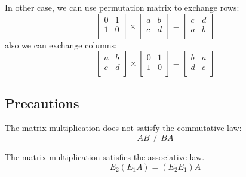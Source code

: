         In other case, we can use permutation matrix to exchange rows:
                \begin{equation}
                    \begin{bmatrix}
                        0 & 1  \\
                        1 & 0  \\
                    \end{bmatrix}
                    \times
                    \begin{bmatrix}
                        a & b  \\
                        c & d  \\
                    \end{bmatrix}
                    =
                    \begin{bmatrix}
                        c & d  \\
                        a & b  \\
                    \end{bmatrix}
                \end{equation}
        also we can exchange columns:
                \begin{equation}
                    \begin{bmatrix}
                        a & b  \\
                        c & d  \\
                    \end{bmatrix}
                    \times
                    \begin{bmatrix}
                        0 & 1  \\
                        1 & 0  \\
                    \end{bmatrix}
                    =
                    \begin{bmatrix}
                        b & a  \\
                        d & c  \\
                    \end{bmatrix}
                \end{equation}
    
    \subsection{Precautions}
        The matrix multiplication does not satisfy the commutative law:
                \begin{equation}
                    AB \neq BA
                \end{equation}
        
        The matrix multiplication satisfies the associative law.
                \begin{equation}
                    E_2(E_1A) = (E_2E_1)A
                \end{equation}
        




    
    
    